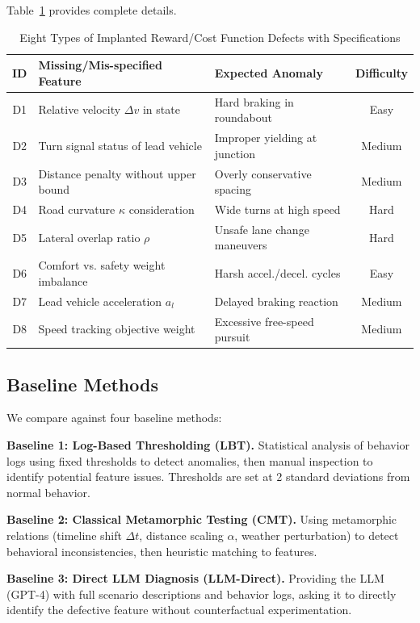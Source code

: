 \documentclass[conference]{IEEEtran}
\theoremstyle{plain}
\begin{document}
Table~\ref{tab:defects} provides complete details.

\begin{table}[h]
\centering
\caption{Eight Types of Implanted Reward/Cost Function Defects with Specifications}
\label{tab:defects}
\small
\begin{tabular}{cp{3.0cm}p{2.8cm}c}
\toprule
\textbf{ID} & \textbf{Missing/Mis-specified Feature} & \textbf{Expected Anomaly} & \textbf{Difficulty} \\
\midrule
D1 & Relative velocity $\Delta v$ in state & Hard braking in roundabout & Easy \\
D2 & Turn signal status of lead vehicle & Improper yielding at junction & Medium \\
D3 & Distance penalty without upper bound & Overly conservative spacing & Medium \\
D4 & Road curvature $\kappa$ consideration & Wide turns at high speed & Hard \\
D5 & Lateral overlap ratio $\rho$ & Unsafe lane change maneuvers & Hard \\
D6 & Comfort vs. safety weight imbalance & Harsh accel./decel. cycles & Easy \\
D7 & Lead vehicle acceleration $a_l$ & Delayed braking reaction & Medium \\
D8 & Speed tracking objective weight & Excessive free-speed pursuit & Medium \\
\bottomrule
\end{tabular}
\end{table}

\subsection{Baseline Methods}

We compare against four baseline methods:

\textbf{Baseline 1: Log-Based Thresholding (LBT).} Statistical analysis of behavior logs using fixed thresholds to detect anomalies, then manual inspection to identify potential feature issues. Thresholds are set at 2 standard deviations from normal behavior.

\textbf{Baseline 2: Classical Metamorphic Testing (CMT).} Using metamorphic relations (timeline shift $\Delta t$, distance scaling $\alpha$, weather perturbation) to detect behavioral inconsistencies, then heuristic matching to features.

\textbf{Baseline 3: Direct LLM Diagnosis (LLM-Direct).} Providing the LLM (GPT-4) with full scenario descriptions and behavior logs, asking it to directly identify the defective feature without counterfactual experimentation.
\end{document}
